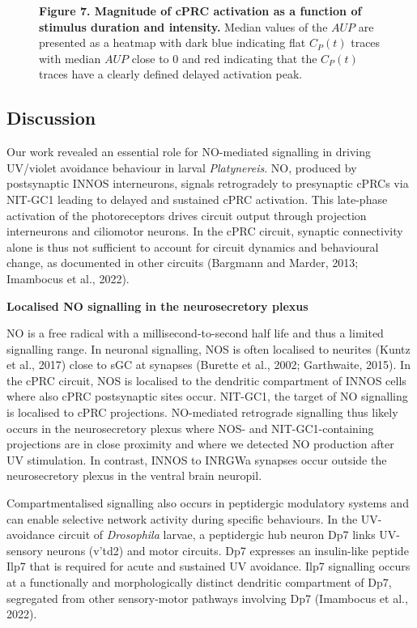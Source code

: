\documentclass[
  10pt,
  onecolumn]{article}
\begin{document}
\begin{figure}
\centering

\caption{\textbf{Figure 7. Magnitude of cPRC activation as a function of
stimulus duration and intensity.} Median values of the \(AUP\) are
presented as a heatmap with dark blue indicating flat \(C_P(t)\) traces
with median \(AUP\) close to 0 and red indicating that the \(C_P(t)\)
traces have a clearly defined delayed activation peak.}
\end{figure}

\hypertarget{discussion}{%
\subsection{Discussion}\label{discussion}}

Our work revealed an essential role for NO-mediated signalling in
driving UV/violet avoidance behaviour in larval \emph{Platynereis}. NO,
produced by postsynaptic INNOS interneurons, signals retrogradely to
presynaptic cPRCs via NIT-GC1 leading to delayed and sustained cPRC
activation. This late-phase activation of the photoreceptors drives
circuit output through projection interneurons and ciliomotor neurons.
In the cPRC circuit, synaptic connectivity alone is thus not sufficient
to account for circuit dynamics and behavioural change, as documented in
other circuits (Bargmann and Marder, 2013; Imambocus et al., 2022).

\textbf{Localised NO signalling in the neurosecretory plexus}

NO is a free radical with a millisecond-to-second half life and thus a
limited signalling range. In neuronal signalling, NOS is often localised
to neurites (Kuntz et al., 2017) close to sGC at synapses (Burette et
al., 2002; Garthwaite, 2015). In the cPRC circuit, NOS is localised to
the dendritic compartment of INNOS cells where also cPRC postsynaptic
sites occur. NIT-GC1, the target of NO signalling is localised to cPRC
projections. NO-mediated retrograde signalling thus likely occurs in the
neurosecretory plexus where NOS- and NIT-GC1-containing projections are
in close proximity and where we detected NO production after UV
stimulation. In contrast, INNOS to INRGWa synapses occur outside the
neurosecretory plexus in the ventral brain neuropil.

Compartmentalised signalling also occurs in peptidergic modulatory
systems and can enable selective network activity during specific
behaviours. In the UV-avoidance circuit of \emph{Drosophila} larvae, a
peptidergic hub neuron Dp7 links UV-sensory neurons (v'td2) and motor
circuits. Dp7 expresses an insulin-like peptide Ilp7 that is required
for acute and sustained UV avoidance. Ilp7 signalling occurs at a
functionally and morphologically distinct dendritic compartment of Dp7,
segregated from other sensory-motor pathways involving Dp7 (Imambocus et
al., 2022).
\end{document}
